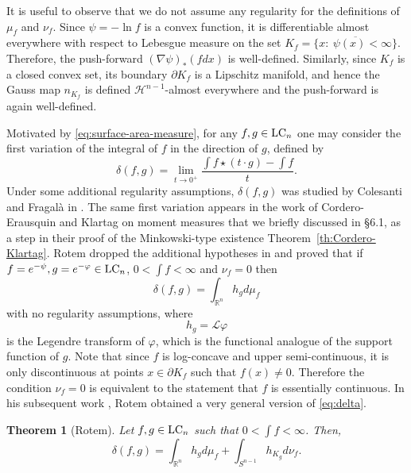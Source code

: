 \documentclass[11pt,leqno]{article}
\newtheorem{theorem}{Theorem}[section]
\theoremstyle{definition}
\theoremstyle{remark}
\numberwithin{equation}{section}
\newcommand{\1}{\textbf{1}}
\begin{document}
It is useful to observe that we do not assume any regularity for the definitions of $\mu_{f}$ and $\nu_{f}$. Since $\psi=-\ln f$
is a convex function, it is differentiable almost everywhere with respect to Lebesgue measure on the set $K_f=\overline{\{ x:\ \psi(x)<\infty\}}$. 
Therefore, the push-forward $(\nabla\psi)_{\ast}(fdx)$ is well-defined. Similarly, since $K_{f}$ is a closed convex set, its
boundary $\partial K_{f}$ is a Lipschitz manifold, and hence the Gauss map $n_{K_{f}}$ is defined $\mathcal{H}^{n-1}$-almost everywhere
and the push-forward is again well-defined. 

Motivated by \eqref{eq:surface-area-measure}, for any $f,g\in{\rm LC}_{n}$ one may consider the first variation of the integral of $f$
in the direction of $g$, defined by 
\begin{equation}\delta(f,g)=\lim_{t\to0^{+}}\frac{\int f\star\left(t\cdot g\right)-\int f}{t}.\label{eq:variation-def}
\end{equation}
Under some additional regularity assumptions, $\delta(f,g)$ was studied by Colesanti and Fragal\`{a} in \cite{Colesanti-Fragala-2013}.
The same first variation appears in the work of Cordero-Erausquin and Klartag \cite{Cordero-Klartag-2015} on moment measures that we
briefly discussed in \S 6.1, as a step in their proof of the Minkowski-type existence Theorem~\ref{th:Cordero-Klartag}. Rotem dropped
the additional hypotheses in \cite{Rotem-2022} and proved that if $f=e^{-\psi},g=e^{-\varphi}\in {\rm LC}_n$, $0<\int f<\infty$ and $\nu_{f}=0$ then
\begin{equation}\label{eq:delta}\delta(f,g)=\int_{\mathbb{R}^{n}}h_{g}d\mu_{f}\end{equation}
with no regularity assumptions, where
$$h_g=\mathcal{L}\varphi$$
is the Legendre transform of $\varphi$, which is the functional analogue of the support function of $g$. Note that since $f$ is log-concave
and upper semi-continuous, it is only discontinuous at points $x\in\partial K_{f}$
such that $f(x)\ne0$. Therefore the condition $\nu_{f}=0$ is equivalent
to the statement that $f$ is essentially continuous. In his subsequent work \cite{Rotem-2023}, Rotem obtained a very general version of \eqref{eq:delta}.
 
\begin{theorem}[Rotem]\label{th:Rotem}Let $f,g\in {\rm LC}_{n}$ such that $0<\int f<\infty$. Then, 
\begin{equation}
\delta(f,g)=\int_{\mathbb{R}^{n}}h_{g}d\mu_{f}+\int_{S^{n-1}}h_{K_{g}}d\nu_{f}.\label{eq:Rotem}
\end{equation}
\end{theorem}
\end{document}
